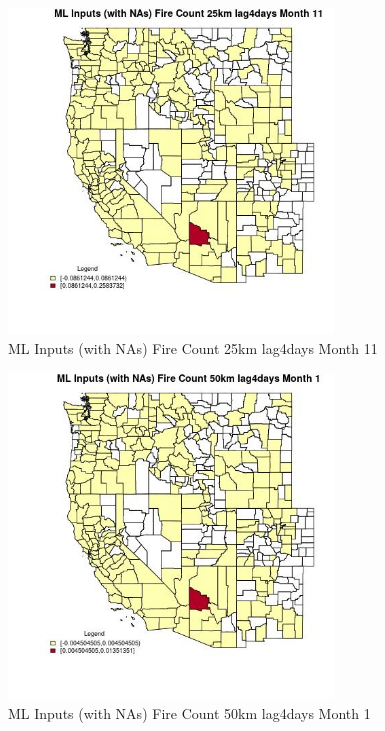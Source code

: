 \begin{figure} 
\centering  
\includegraphics[width=0.77\textwidth]{Code_Outputs/Report_ML_input_PM25_Step4_part_e_de_duplicated_aves_compiled_2019-05-21wNAs_CountyFire_Count_25km_lag4daysmedianMonth11.jpg} 
\caption{\label{fig:Report_ML_input_PM25_Step4_part_e_de_duplicated_aves_compiled_2019-05-21wNAsCountyFire_Count_25km_lag4daysmedianMonth11}ML Inputs (with NAs) Fire Count 25km lag4days Month 11} 
\end{figure} 
 

\begin{figure} 
\centering  
\includegraphics[width=0.77\textwidth]{Code_Outputs/Report_ML_input_PM25_Step4_part_e_de_duplicated_aves_compiled_2019-05-21wNAs_CountyFire_Count_50km_lag4daysmedianMonth1.jpg} 
\caption{\label{fig:Report_ML_input_PM25_Step4_part_e_de_duplicated_aves_compiled_2019-05-21wNAsCountyFire_Count_50km_lag4daysmedianMonth1}ML Inputs (with NAs) Fire Count 50km lag4days Month 1} 
\end{figure} 
 

